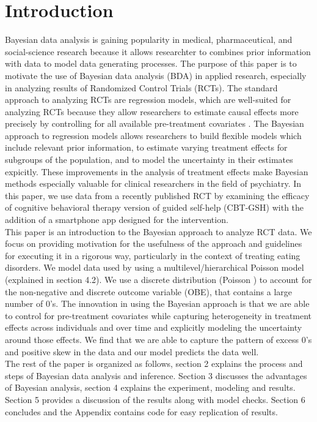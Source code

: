 \documentclass{article}
\begin{document}
\section{Introduction}
Bayesian data analysis is gaining popularity in medical, pharmaceutical, and social-science research because it allows researchter to combines prior information with data to model data generating processes. The purpose of this paper is to motivate the use of Bayesian data analysis (BDA) in applied research, especially in analyzing results of Randomized Control Trials (RCTs). The standard approach to analyzing RCTs are regression models, which are well-suited for analyzing RCTs because they allow researchers to estimate causal effects more precisely by controlling for all available pre-treatment covariates \cite{gelman2006data}. The Bayesian approach to regression models allows researchers to build flexible models which include relevant prior information, to estimate varying treatment effects for subgroups of the population, and to model the uncertainty in their estimates expicitly.  These improvements in the analysis of treatment effects make Bayesian methods especially valuable for clinical researchers in the field of psychiatry.   In this paper, we use data from a recently published RCT by  examining the efficacy of cognitive behavioral therapy version of guided self-help (CBT-GSH) with the addition of a smartphone app designed for the intervention. \\
This paper is an introduction to the Bayesian approach to analyze RCT data. We focus on providing motivation for the usefulness of the approach and guidelines for executing it in a rigorous way, particularly in the context of treating eating disorders. We model data used by  using a multilevel/hierarchical Poisson model (explained in section 4.2). We use a discrete distribution (Poisson )  to account for the non-negative and discrete outcome variable (OBE), that contains a large number of 0's. The innovation in using the Bayesian approach is that we are able to control for pre-treatment covariates while capturing heterogeneity in treatment effects across individuals and over time and explicitly modeling the uncertainty around those effects.  We find that we are able to capture the pattern of excess 0's and positive skew in the data and our model predicts the data well. \\
The rest of the paper is organized as follows, section 2 explains the process and steps of Bayesian data analysis and inference. Section 3 discusses the advantages of Bayesian analysis, section 4 explains the experiment, modeling and results. Section 5 provides a discussion of the results along with model checks. Section 6 concludes and the Appendix contains code for easy replication of results.
\end{document}
